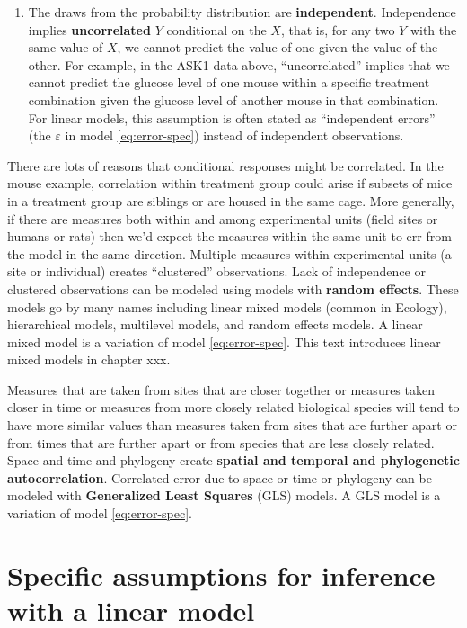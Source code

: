 \documentclass[]{book}
\providecommand{\tightlist}{%
  \setlength{\itemsep}{0pt}\setlength{\parskip}{0pt}}
\begin{document}
\begin{enumerate}
\def\labelenumi{\arabic{enumi}.}
\setcounter{enumi}{1}
\tightlist
\item
  The draws from the probability distribution are \textbf{independent}. Independence implies \textbf{uncorrelated} \(Y\) conditional on the \(X\), that is, for any two \(Y\) with the same value of \(X\), we cannot predict the value of one given the value of the other. For example, in the ASK1 data above, ``uncorrelated'' implies that we cannot predict the glucose level of one mouse within a specific treatment combination given the glucose level of another mouse in that combination. For linear models, this assumption is often stated as ``independent errors'' (the \(\varepsilon\) in model \eqref{eq:error-spec}) instead of independent observations.
\end{enumerate}

There are lots of reasons that conditional responses might be correlated. In the mouse example, correlation within treatment group could arise if subsets of mice in a treatment group are siblings or are housed in the same cage. More generally, if there are measures both within and among experimental units (field sites or humans or rats) then we'd expect the measures within the same unit to err from the model in the same direction. Multiple measures within experimental units (a site or individual) creates ``clustered'' observations. Lack of independence or clustered observations can be modeled using models with \textbf{random effects}. These models go by many names including linear mixed models (common in Ecology), hierarchical models, multilevel models, and random effects models. A linear mixed model is a variation of model \eqref{eq:error-spec}. This text introduces linear mixed models in chapter xxx.

Measures that are taken from sites that are closer together or measures taken closer in time or measures from more closely related biological species will tend to have more similar values than measures taken from sites that are further apart or from times that are further apart or from species that are less closely related. Space and time and phylogeny create \textbf{spatial and temporal and phylogenetic autocorrelation}. Correlated error due to space or time or phylogeny can be modeled with \textbf{Generalized Least Squares} (GLS) models. A GLS model is a variation of model \eqref{eq:error-spec}.

\hypertarget{specific-assumptions-for-inference-with-a-linear-model}{%
\section{Specific assumptions for inference with a linear model}\label{specific-assumptions-for-inference-with-a-linear-model}}
\end{document}

